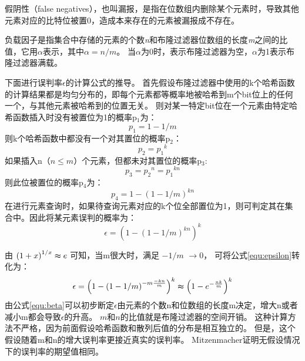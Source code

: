 \begin{definition}
	假阴性（false negatives），也叫漏报，是指在位数组内删除某个元素时，导致其他元素对应的比特位被置0，造成本来存在的元素被漏报成不存在。
\end{definition}

\begin{definition}
	负载因子是指集合中存储的元素的个数\textit{n}和布隆过滤器位数组的长度\textit{m}之间的比值，它用$ \alpha $表示，其中$ \alpha  = {n/m} $。
  当$\alpha $为0时，表示布隆过滤器为空，$ \alpha $为1表示布隆过滤器满载。
\end{definition}

下面进行误判率$\epsilon$的计算公式的推导。
首先假设布隆过滤器中使用的k个哈希函数的计算结果都是均匀分布的，即每个元素都等概率地被哈希到m个bit位上的任何一个，与其他元素被哈希到的位置无关。
则对某一特定bit位在一个元素由特定哈希函数插入时没有被置位为1的概率p$_1$为：
\begin{equation}
p_1 = 1-{1/m}
\end{equation}
则k个哈希函数中都没有一个对其置位的概率p$_2$：
\begin{equation}
p_2 = {p_1}^k
\end{equation}
如果插入n（$n\leqslant m$）个元素，但都未对其置位的概率p$_3$:
\begin{equation}
p_3 = {p_2}^n = {p_1}^{kn}
\end{equation}
则此位被置位的概率p$_4$为：
\begin{equation}
p_4 = 1 - \left(1 - {1/m}\right)^{kn}
\label{equ:alpha}
\end{equation}
在进行元素查询时，如果待查询元素对应的k个位全部置位为1，则可判定其在集合中。因此将某元素误判的概率为：
\begin{equation}
\epsilon = \left(1 - \left(1 - {1/m}\right)^{kn}\right)^k
\label{equ:epsilon}
\end{equation}


由
$ \left(1 + x\right)^{{1/x}} \thickapprox e $
可知，当m很大时，满足
$-{1/m}$ $\to 0$，
可将公式\ref{equ:epsilon}转化为：
\begin{equation}
\epsilon = \left(1 - \left(1 - {1/m}\right)^{{-m}\frac{-kn}{m}}\right)^k \thickapprox \left(1 - e^{-\frac{nk}{m}}\right)^k
\label{equ:beta}
\end{equation}
由公式\ref{equ:beta}可以初步断定$\epsilon$由元素的个数n和位数组的长度m决定，增大n或者减小m都会导致$\epsilon$的升高。
$m$和$n$的比值就是布隆过滤器的空间开销。
这种计算方法不严格，因为前面假设哈希函数和散列后值的分布是相互独立的。
但是，这个假设随着m和n的增大误判率更接近真实的误判率。
Mitzenmacher证明无假设情况下的误判率的期望值相同\cite{mitzenmacher2002compressed}。

